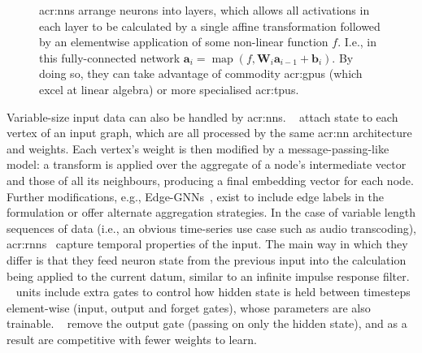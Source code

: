 \begin{figure}
	\centering
	\resizebox{0.9\linewidth}{!}{}
	\caption[An example fully-connected neural network.]{\glspl{acr:nn} arrange neurons into layers, which allows all activations in each layer to be calculated by a single affine transformation followed by an elementwise application of some non-linear function $f$. I.e., in this fully-connected network $\mathbf{a}_{i} = \operatorname{map}\left(f, \mathbf{W}_i\mathbf{a}_{i-1} + \mathbf{b}_i\right)$. By doing so, they can take advantage of commodity \glspl{acr:gpu} (which excel at linear algebra) or more specialised \glspl{acr:tpu}.}\label{fig:fcnn}
\end{figure}


Variable-size input data can also be handled by \glspl{acr:nn}.
~\parencite{DBLP:conf/iclr/KipfW17} attach state to each vertex of an input graph, which are all processed by the same \gls{acr:nn} architecture and weights.
Each vertex's weight is then modified by a message-passing-like model: a transform is applied over the aggregate of a node's intermediate vector and those of all its neighbours, producing a final embedding vector for each node.
Further modifications, e.g., Edge-GNNs~\parencite{Mirhoseini2021}, exist to include edge labels in the formulation or offer alternate aggregation strategies.
In the case of variable length sequences of data (i.e., an obvious time-series use case such as audio transcoding), \glspl{acr:rnn}~\parencite{Rumelhart1986} capture temporal properties of the input.
The main way in which they differ is that they feed neuron state from the previous input into the calculation being applied to the current datum, similar to an infinite impulse response filter.
~\parencite{DBLP:journals/neco/HochreiterS97} units include extra gates to control how hidden state is held between timesteps element-wise (input, output and forget gates), whose parameters are also trainable.
~\parencite{DBLP:conf/emnlp/ChoMGBBSB14} remove the output gate (passing on only the hidden state), and as a result are competitive with fewer weights to learn.

